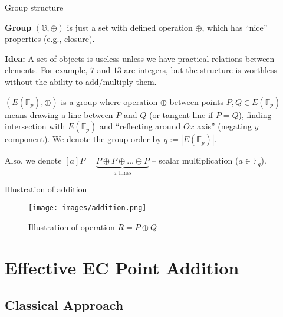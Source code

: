 \documentclass[xcolor={usenames,dvipsnames}]{beamer}
\begin{document}
    \begin{frame}{Group structure}	
        \begin{definition}
            \textbf{Group} $(\mathbb{G}, \oplus)$ is just a set with defined operation $\oplus$, which has ``nice'' properties (e.g., closure).
        \end{definition}
        \pause
        \textbf{Idea:} A set of objects is useless unless we have practical relations between elements. For example, $7$ and $13$ are integers, but the structure is worthless without the ability to add/multiply them.
        \pause
        \begin{theorem}
            $(E(\mathbb{F}_p), \oplus)$ is a group where operation $\oplus$ between points $P,Q \in E(\mathbb{F}_p)$ means drawing a line between $P$ and $Q$ (or tangent line if $P=Q$), finding intersection with $E(\mathbb{F}_p)$ and ``reflecting around $Ox$ axis'' (negating $y$ component). We denote the group order by $q:=|E(\mathbb{F}_p)|$.
        \end{theorem}

        Also, we denote $[a]P = \underbrace{P\oplus P \oplus \dots \oplus P}_{a \; \text{times}}$ -- scalar multiplication ($a \in \mathbb{F}_q$).
    \end{frame}

    \begin{frame}{Illustration of addition}	
        \begin{figure}
            \centering
            \texttt{[image: images/addition.png]}
            \caption{Illustration of operation $R = P \oplus Q$}
        \end{figure}
    \end{frame}
    
    \section{Effective EC Point Addition}
    \subsection{Classical Approach}
\end{document}
